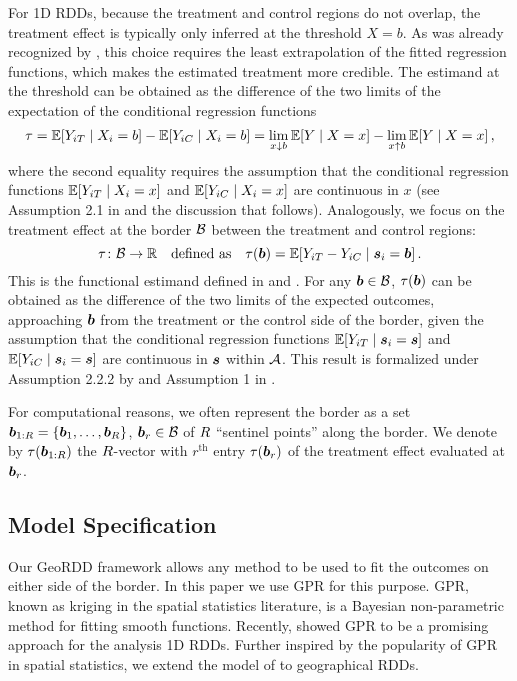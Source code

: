 For 1D RDDs, because the treatment and control regions do not overlap, the treatment effect is typically only inferred at the threshold \(X=b\).
As was already recognized by \citet{thistlethwaite1960regression}, this choice requires the least extrapolation of the fitted regression functions, which makes the estimated treatment more credible.
The estimand at the threshold can be obtained as the difference of the two limits of the expectation of the conditional regression functions
\begin{equation}
    \tau = \E\sbr{Y_{i\treat} \mid X_i=b} - \E\sbr{Y_{i\ctrol} \mid X_i=b} = \lim_{x \downarrow b} \E\sbr{Y \mid X=x} - \lim_{x \uparrow b} \E\sbr{Y \mid X=x}\,,
    \label{eq:rdd_univ_estimand}
\end{equation}
where the second equality requires the assumption that the conditional regression functions \(\E\sbr{Y_{i\treat} \mid X_i=x}\) and \(\E\sbr{Y_{i\ctrol} \mid X_i=x}\) are continuous in \(x\) (see Assumption 2.1 in \citet{imbensrdd} and the discussion that follows).
Analogously, we focus on the treatment effect at the border \(\mathcal{B}\) between the treatment and control regions:
\begin{equation}
\tau\colon \border \rightarrow \mathbb{R}
\quad\text{defined as}\quad
\tau\del{\sentinel} = \E\sbr{Y_{i\treat} - Y_{i\ctrol} \mid \svec_i = \sentinel}
\,.
\label{eq:functional_estimand}
\end{equation}
This is the functional estimand defined in \citet{imbens2011regression} and \citet{keele_titiunik_2015}.
For any \(\bm{b} \in \mathcal{B}\), \(\tau(\bm{b})\) can be obtained as the difference of the two limits of the expected outcomes, approaching \(\bm{b}\) from the treatment or the control side of the border, given the assumption that the conditional regression functions \(\E\sbr{Y_{i\treat} \mid \svec_i=\svec}\) and \(\E\sbr{Y_{i\ctrol} \mid \svec_i=\svec}\) are continuous in \(\bm{s}\) within \(\mathcal{A}\).
This result is formalized under Assumption 2.2.2 by \citet{imbens2011regression} and Assumption 1 in \citet{keele_titiunik_2015}.

For computational reasons, we often represent the border as a set \(\bm{b}_{1:R}=\left\lbrace\bm{b}_1,\ldots,\bm{b}_R\right\rbrace\), \(\bm{b}_r \in \mathcal{B}\) of \(R\) ``sentinel points'' along the border.
We denote by \(\tau(\bm{b}_{1:R})\) the \(R\)-vector with \(r^\mathrm{th}\) entry \(\tau(\bm{b}_r)\) of the treatment effect evaluated at \(\bm{b}_r\).


\subsection{Model Specification}
\label{sec:gpmodel}
Our GeoRDD framework allows any method to be used to fit the outcomes on either side of the border.
In this paper we use GPR for this purpose.
GPR, known as kriging in the spatial statistics literature, is a Bayesian non-parametric method for fitting smooth functions. 
Recently, \citet{Branson:2017qy} showed GPR to be a promising approach for the analysis 1D RDDs.
Further inspired by the popularity of GPR in spatial statistics, we extend the model of \citet{Branson:2017qy} to geographical RDDs.

